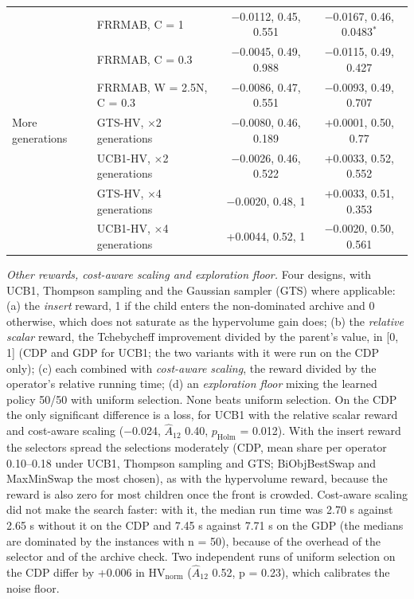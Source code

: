 \documentclass[final,3p,times,11pt,authoryear]{elsarticle}
\begin{document}
\begin{center}
\begin{tabularx}{\linewidth}{lXcc}
 & FRRMAB, C = 1 & $-$0.0112, 0.45, 0.551 & $-$0.0167, 0.46, 0.0483$^{*}$ \\
 & FRRMAB, C = 0.3 & $-$0.0045, 0.49, 0.988 & $-$0.0115, 0.49, 0.427 \\
 & FRRMAB, W = 2.5N, C = 0.3 & $-$0.0086, 0.47, 0.551 & $-$0.0093, 0.49, 0.707 \\
More generations & GTS-HV, $\times$2 generations & $-$0.0080, 0.46, 0.189 & +0.0001, 0.50, 0.77 \\
 & UCB1-HV, $\times$2 generations & $-$0.0026, 0.46, 0.522 & +0.0033, 0.52, 0.552 \\
 & GTS-HV, $\times$4 generations & $-$0.0020, 0.48, 1 & +0.0033, 0.51, 0.353 \\
 & UCB1-HV, $\times$4 generations & +0.0044, 0.52, 1 & $-$0.0020, 0.50, 0.561 \\
\bottomrule
\end{tabularx}
\end{center}

\emph{Other rewards, cost-aware scaling and exploration floor.} Four designs, with UCB1, Thompson sampling and the Gaussian sampler (GTS) where applicable: (a) the \emph{insert} reward, 1 if the child enters the non-dominated archive and 0 otherwise, which does not saturate as the hypervolume gain does; (b) the \emph{relative scalar} reward, the Tchebycheff improvement divided by the parent's value, in [0, 1] (CDP and GDP for UCB1; the two variants with it were run on the CDP only); (c) each combined with \emph{cost-aware scaling}, the reward divided by the operator's relative running time; (d) an \emph{exploration floor} mixing the learned policy 50/50 with uniform selection. None beats uniform selection. On the CDP the only significant difference is a loss, for UCB1 with the relative scalar reward and cost-aware scaling ($-$0.024, $\hat{A}_{12}$ 0.40, $p_{\mathrm{Holm}}$ = 0.012). With the insert reward the selectors spread the selections moderately (CDP, mean share per operator 0.10--0.18 under UCB1, Thompson sampling and GTS; BiObjBestSwap and MaxMinSwap the most chosen), as with the hypervolume reward, because the reward is also zero for most children once the front is crowded. Cost-aware scaling did not make the search faster: with it, the median run time was 2.70 s against 2.65 s without it on the CDP and 7.45 s against 7.71 s on the GDP (the medians are dominated by the instances with n = 50), because of the overhead of the selector and of the archive check. Two independent runs of uniform selection on the CDP differ by +0.006 in $\mathrm{HV}_{\mathrm{norm}}$ ($\hat{A}_{12}$ 0.52, p = 0.23), which calibrates the noise floor.
\end{document}
